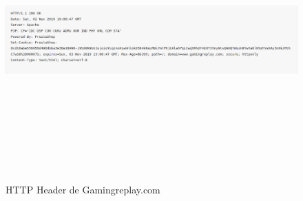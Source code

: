 \begin{figure}[h!]
\caption{HTTP Header de Gamingreplay.com}
\centering
\includegraphics[width=\textwidth,height=10cm,keepaspectratio]{Images/HTTPHeader.png}
\label{fig:HTTPHeader}
\end{figure}





